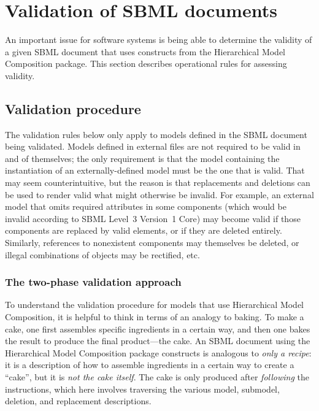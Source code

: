
\section{Validation of SBML documents}
\label{apdx-validation}

An important issue for software systems is being able to determine the
validity of a given SBML document that uses constructs from the
Hierarchical Model Composition package.  This section describes
operational rules for assessing validity.  


\subsection{Validation procedure}
\label{validation-procedure}

The validation rules below only apply to models
defined in the SBML document being validated.  Models defined in
external files are not required to be valid in and of themselves; the
only requirement is that the model containing the instantiation of an
externally-defined model must be the one that is valid.  That may seem
counterintuitive, but the reason is that replacements and deletions can
be used to render valid what might otherwise be invalid.  For example,
an external model that omits required attributes in some components
(which would be invalid according to SBML Level~3 Version~1 Core) may
become valid if those components are replaced by valid elements, or if
they are deleted entirely.  Similarly, references to nonexistent
components may themselves be deleted, or illegal combinations of objects
may be rectified, etc.


\subsubsection{The two-phase validation approach}

To understand the validation procedure for models that use Hierarchical
Model Composition, it is helpful to think in terms of an analogy to
baking.  To make a cake, one first assembles specific ingredients in a
certain way, and then one bakes the result to produce the final
product---the cake.  An SBML document using the Hierarchical Model
Composition package constructs is analogous to \emph{only a recipe}: it
is a description of how to assemble ingredients in a certain way to
create a ``cake'', but it is \emph{not the cake itself}.  The cake is
only produced after \emph{following} the instructions, which here
involves traversing the various model, submodel, deletion, and
replacement descriptions.

